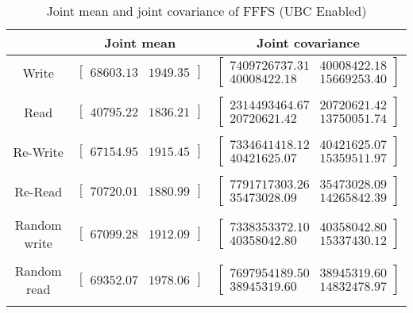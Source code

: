 
	\begin{table}
	\caption{Joint mean and joint covariance of FFFS (UBC Enabled)}
	\begin{tabular}{| c | c | c |}
	\hline
	{} & \textbf{Joint mean} & \textbf{Joint covariance}\\
	\hline
	\hline
Write & $\left[ \begin{array}{rr} 68603.13 & 1949.35 \end{array}\right] $ & $\left[ \begin{array}{rr} 7409726737.31 & 40008422.18 \\ 40008422.18 & 15669253.40 \end{array}\right] $\\ 
{} & {} & {} \\ 
Read & $\left[ \begin{array}{rr} 40795.22 & 1836.21 \end{array}\right] $ & $\left[ \begin{array}{rr} 2314493464.67 & 20720621.42 \\ 20720621.42 & 13750051.74 \end{array}\right] $\\ 
{} & {} & {} \\ 
Re-Write & $\left[ \begin{array}{rr} 67154.95 & 1915.45 \end{array}\right] $ & $\left[ \begin{array}{rr} 7334641418.12 & 40421625.07 \\ 40421625.07 & 15359511.97 \end{array}\right] $\\ 
{} & {} & {} \\ 
Re-Read & $\left[ \begin{array}{rr} 70720.01 & 1880.99 \end{array}\right] $ & $\left[ \begin{array}{rr} 7791717303.26 & 35473028.09 \\ 35473028.09 & 14265842.39 \end{array}\right] $\\ 
{} & {} & {} \\ 
Random write & $\left[ \begin{array}{rr} 67099.28 & 1912.09 \end{array}\right] $ & $\left[ \begin{array}{rr} 7338353372.10 & 40358042.80 \\ 40358042.80 & 15337430.12 \end{array}\right] $\\ 
{} & {} & {} \\ 
Random read & $\left[ \begin{array}{rr} 69352.07 & 1978.06 \end{array}\right] $ & $\left[ \begin{array}{rr} 7697954189.50 & 38945319.60 \\ 38945319.60 & 14832478.97 \end{array}\right] $\\ 
{} & {} & {} \\ 

	\hline
	\end{tabular}
	\label{tbl:stat-fffs_ubc_enabled}
	\end{table}
